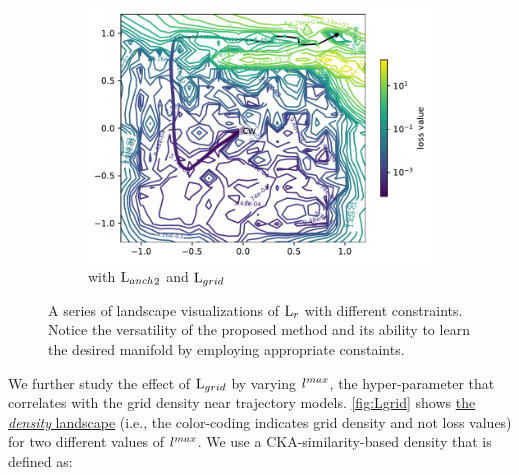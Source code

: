 \documentclass[letterpaper]{article} %
\begin{document}
\begin{figure}[htb]
\begin{subfigure}[b]{0.3\textwidth}
              \end{subfigure}
              \hfill
              \begin{subfigure}[b]{0.3\textwidth}
                \includegraphics[width=\textwidth]{figures/round3/grid8/map_residual_train_loss_loss.pdf}
                \caption{with ${\text{L}_{anch}}_2$ and $\text{L}_{grid}$ }
                \label{fig:constraintgrid}
              \end{subfigure}

              \caption{A series of \proposedautencoder{} landscape visualizations of $\text{L}_{r}$ with different constraints. Notice the versatility of the proposed method and its ability to learn the desired manifold by employing appropriate constaints.}
              \label{fig:constraints}
        \end{figure}

        
        We further study the effect of $\text{L}_{grid}$ by varying $l^{max}$, the hyper-parameter that correlates with the grid density near trajectory models. \cref{fig:Lgrid} shows \underline{the \textit{density} landscape} (i.e., the color-coding indicates grid density and not loss values) for two different values of $l^{max}$. 
        We use a $\text{CKA}$-similarity-based density that is defined as:
\end{document}
